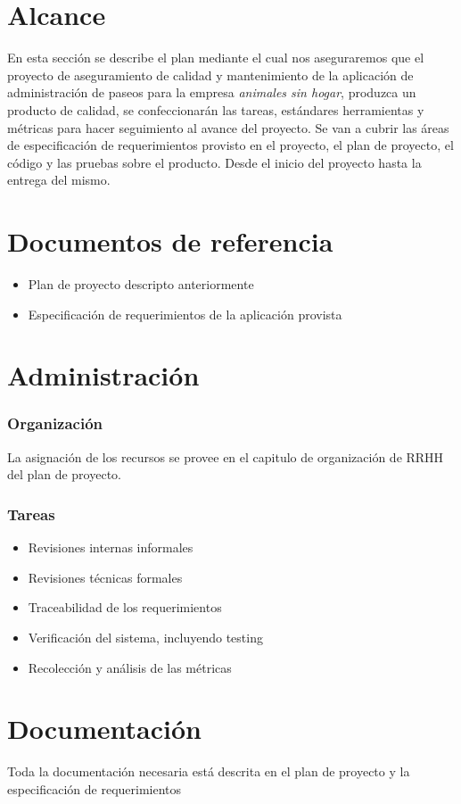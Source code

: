 
\section{Alcance}
En esta sección se describe el plan mediante el cual nos aseguraremos que el proyecto de aseguramiento de calidad y mantenimiento de la aplicación de administración de paseos para la empresa \textit{animales sin hogar}, produzca un producto de calidad, se confeccionarán las tareas, estándares herramientas y métricas para hacer seguimiento al avance del proyecto. Se van a cubrir las áreas de especificación de requerimientos provisto en el proyecto, el plan de proyecto, el código y las pruebas sobre el producto. Desde el inicio del proyecto hasta la entrega del mismo.

\section{Documentos de referencia}
\begin{itemize}
    \item Plan de proyecto descripto anteriormente
    \item Especificación de requerimientos de la aplicación provista
\end{itemize}
\section{Administración}
\subsubsection{Organización}
La asignación de los recursos se provee en el capitulo de organización de RRHH del plan de proyecto.
\subsubsection{Tareas}
\begin{itemize}
    \item Revisiones internas informales
    \item Revisiones técnicas formales
    \item Traceabilidad de los requerimientos
    \item Verificación del sistema, incluyendo testing
    \item Recolección y análisis de las métricas
\end{itemize}

\section{Documentación}
Toda la documentación necesaria está descrita en el plan de proyecto y la especificación de requerimientos

